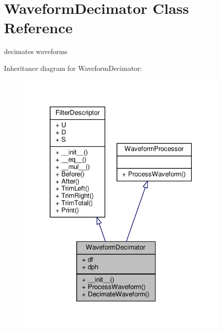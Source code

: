 \hypertarget{classSignalIntegrity_1_1TimeDomain_1_1Filters_1_1WaveformDecimator_1_1WaveformDecimator}{}\section{Waveform\+Decimator Class Reference}
\label{classSignalIntegrity_1_1TimeDomain_1_1Filters_1_1WaveformDecimator_1_1WaveformDecimator}


decimates waveforms  




Inheritance diagram for Waveform\+Decimator\+:
\nopagebreak
\begin{figure}[H]
\begin{center}
\leavevmode
\includegraphics[width=294pt]{classSignalIntegrity_1_1TimeDomain_1_1Filters_1_1WaveformDecimator_1_1WaveformDecimator__inherit__graph}
\end{center}
\end{figure}


